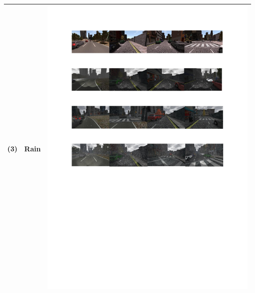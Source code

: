 \documentclass{svproc}
\begin{document}
\begin{table}[!t]
\begin{tabular}{|C{1.5cm}|c|C{8.5cm}|}
		(3)	& Rain &  \begin{minipage}{.9\textwidth}\includegraphics[scale=.5,trim=2cm 16.5cm 2cm 10.5cm,clip]{examples.pdf}\end{minipage} \\ \hline

\end{tabular}
\end{table}
\end{document}
